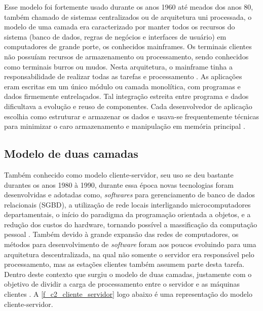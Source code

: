 Esse modelo foi fortemente usado durante os anos 1960 até meados dos anos 80, também chamado de sistemas centralizados ou de arquitetura uni processada, o modelo de uma camada era caracterizado por manter todos os recursos do sistema (banco de dados, regras de negócios e interfaces de usuário) em computadores de grande porte, os conhecidos mainframes. Os terminais clientes não possuíam recursos de armazenamento ou processamento, sendo conhecidos como terminais burros ou mudos. Nesta arquitetura, o mainframe tinha a responsabilidade de realizar todas as tarefas e processamento \cite{devmediaMultiCamada2018}. As aplicações eram escritas em um único módulo ou camada monolítica, com programas e dados firmemente entrelaçados. Tal integração estreita entre programa e dados dificultava a evolução e reuso de componentes. Cada desenvolvedor de aplicação escolhia como estruturar e armazenar os dados e usava-se frequentemente técnicas para minimizar o caro armazenamento e manipulação em memória principal \cite{devmediaMultiCamadaP12018}.


\subsection*{Modelo de duas camadas}

Também conhecido como modelo cliente-servidor, seu uso se deu bastante durantes os anos 1980 à 1990, durante essa época novas tecnologias foram desenvolvidas e adotadas como, \textit{softwares} para gerenciamento de banco de dados relacionais (SGBD), a utilização de rede locais interligando microcomputadores departamentais, o início do paradigma da programação orientada a objetos, e a redução dos custos do hardware, tornando possível a massificação da computação pessoal \cite{devmediaMultiCamadaP12018}. Também devido à grande expansão das redes de computadores, os métodos para desenvolvimento de \textit{software} foram aos poucos evoluindo para uma arquitetura descentralizada, na qual não somente o servidor era responsável pelo processamento, mas as estações clientes também assumem parte desta tarefa. Dentro deste contexto que surgiu o modelo de duas camadas, justamente com o objetivo de dividir a carga de processamento entre o servidor e as máquinas clientes \cite{devmediaMultiCamada2018}. A \autoref{f_c2_cliente_servidor} logo abaixo é uma representação do modelo cliente-servidor.

